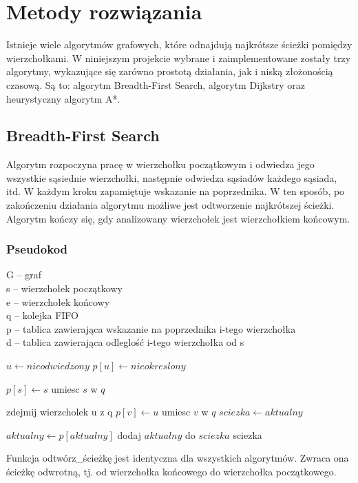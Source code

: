 \documentclass[11pt,a4paper]{article}
\begin{document}
\section{Metody rozwiązania}
Istnieje wiele algorytmów grafowych, które odnajdują najkrótsze ścieżki pomiędzy
wierzchołkami. W niniejszym projekcie wybrane i zaimplementowane zostały trzy
algorytmy, wykazujące się zarówno prostotą działania, jak i niską złożonością
czasową. Są to: algorytm Breadth-First Search, algorytm Dijkstry oraz heurystyczny algorytm A*.

\subsection{Breadth-First Search}
Algorytm rozpoczyna pracę w wierzchołku początkowym i odwiedza jego wszystkie sąsiednie wierzchołki,
następnie odwiedza sąsiadów każdego sąsiada, itd. W każdym kroku zapamiętuje wskazanie na poprzednika.
W ten sposób, po zakończeniu działania algorytmu możliwe jest odtworzenie
najkrótszej ścieżki. Algorytm kończy się, gdy analizowany wierzchołek jest wierzchołkiem końcowym.

\subsubsection{Pseudokod}\label{bfs_pseudokod}
G – graf\\
s – wierzchołek początkowy\\
e – wierzchołek końcowy\\
q – kolejka FIFO\\
p – tablica zawierająca wskazanie na poprzednika i-tego wierzchołka\\
d – tablica zawierająca odleglość i-tego wierzchołka od s\\
\begin{algorithmic}
		\State $u\gets nieodwiedzony$
   	\State $p[u]\gets nieokreslony$
   \EndFor
   
   \State $p[s]\gets s$
   \State umiesc $s$ w $q$
   
   	\State zdejmij wierzcholek u z q
   	 \Return
   	\EndIf
   			\State $p[v]\gets u$
   			\State umiesc $v$ w $q$
   		\EndIf
   \EndFor
   \EndWhile
\EndFunction
\Statex
{}
	\State $sciezka\gets aktualny$
   
   	\State $aktualny\gets p[aktualny]$
   	\State dodaj $aktualny$ do $sciezka$
   \EndWhile
   \Return sciezka
\EndFunction
\end{algorithmic}
\vspace{5mm}
Funkcja odtwórz\_ścieżkę jest identyczna dla wszystkich algorytmów. Zwraca ona ścieżkę odwrotną, tj. od wierzchołka końcowego do wierzchołka początkowego.
\end{document}
